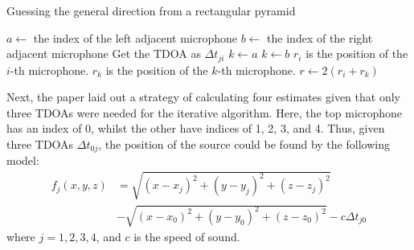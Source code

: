 \documentclass[notitlepage]{report}
\begin{document}
\begin{algorithm}[H]
\caption{Guessing the general direction from a rectangular pyramid}
\label{alg:pyramid_guess}
\begin{algorithmic}
		\State $a \gets$ the index of the left adjacent microphone
		\State $b \gets$ the index of the right adjacent microphone
			\State Get the TDOA as $\Delta t_{ji}$
		\EndFor
				\State $k \gets a$
			\Else
				\State $k \gets b$
			\EndIf
			\State $r_i$ is the position of the $i$-th microphone.
			\State $r_k$ is the position of the $k$-th microphone.
			\State $r \gets 2 (r_{i} + r_{k})$ 
		\EndIf
	\EndFor
\end{algorithmic}
\end{algorithm}

Next, the paper laid out a strategy of calculating four estimates given that only three TDOAs were needed for the iterative algorithm. Here, the top microphone has an index of 0, whilst the other have indices of 1, 2, 3, and 4. Thus, given three TDOAs $\Delta t_{0j}$, the position of the source could be found by the following model:
\begin{equation}
\begin{split}
f_j(x,y,z) &= \sqrt{\left(x-x_j\right)^2 + (y - y_j)^2 + (z - z_j)^2} \\
&- \sqrt{\left(x-x_0\right)^2 + (y - y_0)^2 + (z - z_0)^2}
- c \Delta t_{j0}
\end{split}
\end{equation}
where $j = 1, 2, 3, 4$, and $c$ is the speed of sound.
\end{document}
